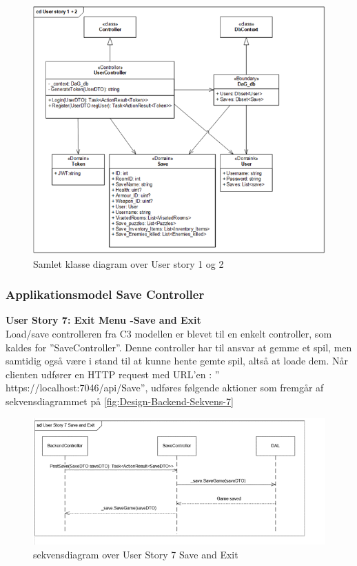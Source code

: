 \begin{figure}[H]
\centering
\includegraphics[width = \textwidth]{02-Body/Images/Backend_klasse_1_2.PNG}
\caption{Samlet klasse diagram over User story 1 og 2}
\label{fig:Design-Backend-Klasse-1-2}
\end{figure}

\subsubsection{Applikationsmodel Save Controller}
\textbf{User Story 7: Exit Menu -\g Save and Exit}\\
Load/save controlleren fra C3 modellen er blevet til en enkelt controller, som kaldes for ”SaveController”. Denne controller har til ansvar at gemme et spil, men samtidig også være i stand til at kunne hente gemte spil, altså at loade dem.
Når clienten udfører en HTTP request med URL’en : ” https://localhost:7046/api/Save”, udføres følgende aktioner som fremgår af sekvensdiagrammet på \autoref{fig:Design-Backend-Sekvens-7}\\

\begin{figure}[H]
\centering
\includegraphics[width = \textwidth]{02-Body/Images/Backend_sekvens_7.PNG}
\caption{sekvensdiagram over User Story 7 Save and Exit}
\label{fig:Design-Backend-Sekvens-7}
\end{figure}

